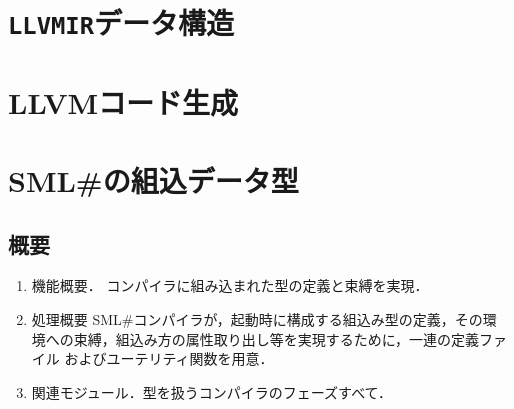 \documentclass{jbook}
\newcommand{\txt}[2]{#1}
\newcommand{\smlsharp}{SML\#}
\newcommand{\code}[1]{\mbox{\large\tt #1}}
\begin{document}
\chapter{\txt
{\code{LLVMIR}データ構造}
{The \code{LLVMIR} data structure}
}
\label{chap:LLVMIR}

\chapter{\txt
{LLVMコード生成}
{LLVM Code Generation}
}
\label{chap:LLVMCodegeneration}

\chapter{\txt
{\smlsharp{}の組込データ型}
{Builtin Datatypes in \smlsharp{}}
}
\label{chap:bootstraping}

\section{概要}
\begin{enumerate}
\item 機能概要．
	コンパイラに組み込まれた型の定義と束縛を実現．
\item 処理概要
	\smlsharp{}コンパイラが，起動時に構成する組込み型の定義，その環
境への束縛，組込み方の属性取り出し等を実現するために，一連の定義ファイル
およびユーテリティ関数を用意．
\item 関連モジュール．型を扱うコンパイラのフェーズすべて．

\end{enumerate}
\end{document}
